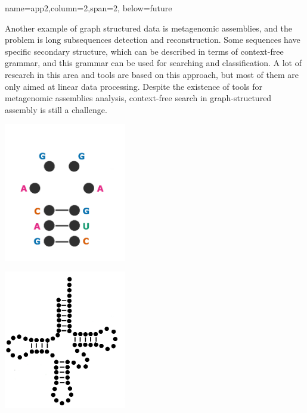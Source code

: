 \documentclass[a0paper,portrait]{baposter}
\begin{document}
\begin{poster}
{name=app2,column=2,span=2, below=future}
{
Another example of graph structured data is metagenomic assemblies, and the problem is long subsequences detection and reconstruction.
Some sequences have specific secondary structure, which can be described in terms of context-free grammar, and this grammar can be used for searching and classification.
A lot of research in this area and tools are based on this approach, but most of them are only aimed at linear data processing.
Despite the existence of tools for metagenomic assemblies analysis, context-free search in graph-structured assembly is still a challenge.
\begin{center}
\includegraphics[width=0.4\textwidth]{RNA_small.png}
\end{center}
\begin{center}
\includegraphics[width=0.4\textwidth]{tRNA.png}
\end{center}

}




\end{poster}
\end{document}
